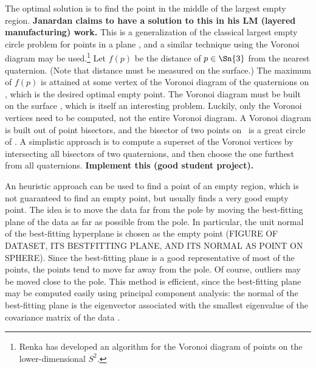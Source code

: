 \documentclass[11pt]{article}
\begin{document}

The optimal solution is to find
the point in the middle of the largest empty region.
{\bf Janardan claims to have a solution to this in his LM (layered manufacturing) work.}
This is a generalization of the classical largest empty circle
problem for points in a plane \cite{shamos85}, 
and a similar technique using the Voronoi diagram may be used.\footnote{Renka \cite{renka}
  has developed an algorithm for the Voronoi diagram of points on the lower-dimensional
  $S^2$.}
Let $f(p)$ be the distance of $p \in \Sn{3}$ from the nearest quaternion.
(Note that distance must be measured on the surface.)
The maximum of $f(p)$ 
is attained at some vertex of the Voronoi diagram of the quaternions on ,
which is the desired optimal empty point.
The Voronoi diagram must be built on the surface , which 
is itself an interesting problem.
Luckily, only the Voronoi vertices need to be computed,
not the entire Voronoi diagram.
A Voronoi diagram is built out of point bisectors, and
the bisector of two points on \ is a great circle of .
A simplistic approach is to compute a superset of the Voronoi vertices
by intersecting all bisectors of two quaternions, and then 
choose the one furthest from all quaternions.
{\bf Implement this (good student project).}

An heuristic approach can be used to find a point of an
empty region, which is not guaranteed to find an empty point, 
but usually finds a very good empty point.
The idea is to move the data far from the pole by moving the best-fitting plane
of the data as far as possible from the pole.
In particular, the unit normal of the best-fitting hyperplane 
is chosen as the empty point (FIGURE OF DATASET, ITS BESTFITTING PLANE, AND ITS NORMAL AS POINT ON SPHERE).
Since the best-fitting plane is a good representative of most of the
points, the points tend to move far away from the pole.
Of course, outliers may be moved close to the pole.
This method is efficient, since the best-fitting plane may be computed
easily using principal component analysis:
the normal of the best-fitting plane is the eigenvector associated with the
smallest eigenvalue of the covariance matrix of the data \cite{ballard82}.
\end{document}
